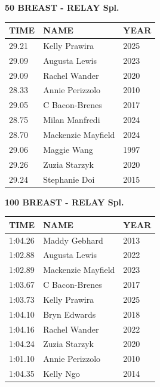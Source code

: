 \begin{table}[H]
\centering
\begin{minipage}[t]{0.6\textwidth}
\centering
\textbf{50 BREAST - RELAY Spl.}\\[0.1cm]
\begin{tabular}{@{}p{1.8cm}p{2.8cm}p{1.2cm}@{}}
\hline
    \textbf{TIME} & \textbf{NAME} & \textbf{YEAR} \\
\hline
    29.21 & Kelly Prawira & 2025 \\
    29.09 & Augusta Lewis & 2023 \\
    29.09 & Rachel Wander & 2020 \\
    28.33 & Annie Perizzolo & 2010 \\
    29.05 & C Bacon-Brenes & 2017 \\
    28.75 & Milan Manfredi & 2024 \\
    28.70 & Mackenzie Mayfield & 2024 \\
    29.06 & Maggie Wang & 1997 \\
    29.26 & Zuzia Starzyk & 2020 \\
    29.24 & Stephanie Doi & 2015 \\
\hline
\end{tabular}
\end{minipage}
\end{table}

\begin{table}[H]
\centering
\begin{minipage}[t]{0.6\textwidth}
\centering
\textbf{100 BREAST - RELAY Spl.}\\[0.1cm]
\begin{tabular}{@{}p{1.8cm}p{2.8cm}p{1.2cm}@{}}
\hline
    \textbf{TIME} & \textbf{NAME} & \textbf{YEAR} \\
\hline
    1:04.26 & Maddy Gebhard & 2013 \\
    1:02.88 & Augusta Lewis & 2022 \\
    1:02.89 & Mackenzie Mayfield & 2023 \\
    1:03.67 & C Bacon-Brenes & 2017 \\
    1:03.73 & Kelly Prawira & 2025 \\
    1:04.10 & Bryn Edwards & 2018 \\
    1:04.16 & Rachel Wander & 2022 \\
    1:04.24 & Zuzia Starzyk & 2020 \\
    1:01.10 & Annie Perizzolo & 2010 \\
    1:04.35 & Kelly Ngo & 2014 \\
\hline
\end{tabular}
\end{minipage}
\end{table}

